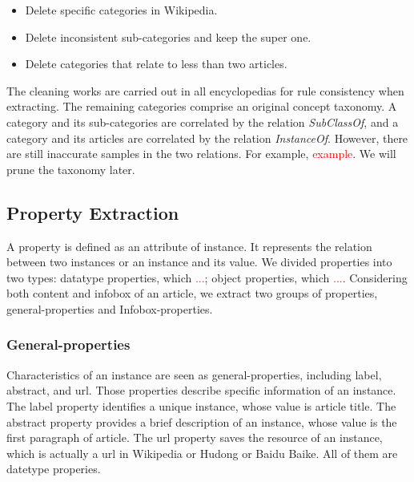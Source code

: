\documentclass[runningheads,a4paper]{llncs}
\begin{document}
\begin{itemize}
    \item Delete specific categories in Wikipedia.
    \item Delete inconsistent sub-categories and keep the super one.
    \item Delete categories that relate to less than two articles.
\end{itemize}
The cleaning works are carried out in all encyclopedias for rule consistency when extracting. The remaining categories comprise an original concept taxonomy. A category and its sub-categories are correlated by the relation \emph{SubClassOf}, and a category and its articles are correlated by the relation \emph{InstanceOf}. However, there are still inaccurate samples in the two relations. For example, \textcolor{red}{example}. We will prune the taxonomy later.

\subsection{Property Extraction}
\label{sec:pe}
A property is defined as an attribute of instance. It represents the relation between two instances or an instance and its value. We divided properties into two types: datatype properties, which \textcolor{red}{...}; object properties, which \textcolor{red}{...}. Considering both content and infobox of an article, we extract two groups of properties, general-properties and Infobox-properties.

\subsubsection{General-properties}
Characteristics of an instance are seen as general-properties, including label, abstract, and url. Those properties describe specific information of an instance. The label property identifies a unique instance, whose value is article title. The abstract property provides a brief description of an instance, whose value is the first paragraph of article. The url property saves the resource of an instance, which is actually a url in Wikipedia or Hudong or Baidu Baike. All of them are datetype properies.
\end{document}
